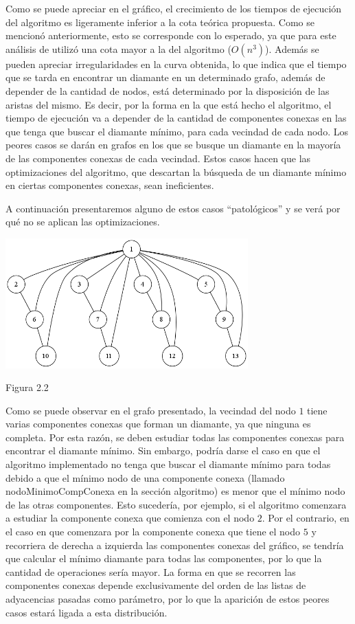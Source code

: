 \documentclass[a4paper,11pt] {article}
\begin{document}
Como se puede apreciar en el gr\'afico, el crecimiento de los tiempos de ejecuci\'on del algoritmo es ligeramente inferior a la cota te\'orica propuesta. Como se mencion\'o anteriormente, esto se corresponde con lo esperado, ya que para este an\'alisis de utiliz\'o una cota mayor a la del algoritmo ($O(n^{3})$). Adem\'as se pueden apreciar irregularidades en la curva obtenida, lo que indica que el tiempo que se tarda en encontrar un diamante en un determinado grafo, adem\'as de depender de la cantidad de nodos, est\'a determinado por la disposici\'on de las aristas del mismo. Es decir, por la forma en la que est\'a hecho el algoritmo, el tiempo de ejecuci\'on va a depender de la cantidad de componentes conexas en las que tenga que buscar el diamante m\'inimo, para cada vecindad de cada nodo. Los peores casos se dar\'an en grafos en los que se busque un diamante en la mayor\'ia de las componentes conexas de cada vecindad. Estos casos hacen que las optimizaciones del algoritmo, que descartan la b\'usqueda de un diamante m\'inimo en ciertas componentes conexas, sean ineficientes. 

A continuaci\'on presentaremos alguno de estos casos ``patol\'ogicos'' y se ver\'a por qu\'e no se aplican las optimizaciones.

\begin{center}
 \includegraphics[width=0.7\textwidth]{Grafos/grafomati.png}
\begin{center}
Figura 2.2
\end{center}
\end{center}

Como se puede observar en el grafo presentado, la vecindad del nodo $1$ tiene varias componentes conexas que forman un diamante, ya que ninguna es completa. Por esta raz\'on, se deben estudiar todas las componentes conexas para encontrar el diamante m\'inimo. Sin embargo, podr\'ia darse el caso en que el algoritmo implementado no tenga que buscar el diamante m\'inimo para todas debido a que el m\'inimo nodo de una componente conexa (llamado nodoMinimoCompConexa en la secci\'on algoritmo) es menor que el m\'inimo nodo de las otras componentes. Esto suceder\'ia, por ejemplo, si el algoritmo comenzara a estudiar la componente conexa que comienza con el nodo $2$. Por el contrario, en el caso en que comenzara por la componente conexa que tiene el nodo $5$ y recorriera de derecha a izquierda las componentes conexas del gr\'afico, se tendr\'ia que calcular el m\'inimo diamante para todas las componentes, por lo que la cantidad de operaciones ser\'ia mayor. La forma en que se recorren las componentes conexas depende exclusivamente del orden de las listas de adyacencias pasadas como par\'ametro, por lo que la aparici\'on de estos peores casos estar\'a ligada a esta distribuci\'on. 
\end{document}
